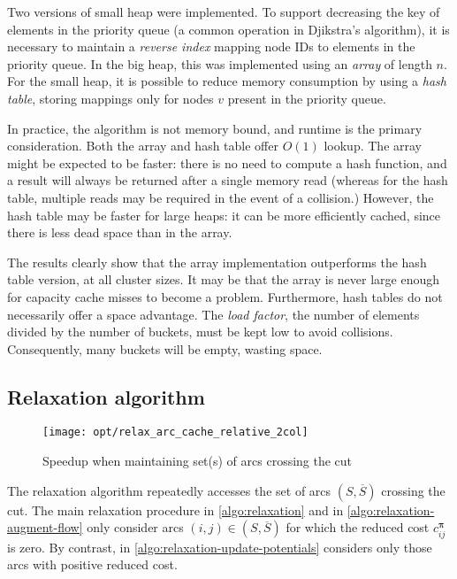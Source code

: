 Two versions of small heap were implemented. To support decreasing the key of elements in the priority queue (a common operation in Djikstra's algorithm), it is necessary to maintain a \emph{reverse index} mapping node IDs to elements in the priority queue. In the big heap, this was implemented using an \emph{array} of length $n$. For the small heap, it is possible to reduce memory consumption by using a \emph{hash table}, storing mappings only for nodes $v$ present in the priority queue.

In practice, the algorithm is not memory bound, and runtime is the primary consideration. Both the array and hash table offer $O(1)$ lookup. The array might be expected to be faster: there is no need to compute a hash function, and a result will always be returned after a single memory read (whereas for the hash table, multiple reads may be required in the event of a collision.) However, the hash table may be faster for large heaps: it can be more efficiently cached, since there is less dead space than in the array.

The results clearly show that the array implementation outperforms the hash table version, at all cluster sizes. It may be that the array is never large enough for capacity cache misses to become a problem. Furthermore, hash tables do not necessarily offer a space advantage. The \emph{load factor}, the number of elements divided by the number of buckets, must be kept low to avoid collisions. Consequently, many buckets will be empty, wasting space.


\subsection{Relaxation algorithm}

\begin{figure}
    \centering
    \texttt{[image: opt/relax\_arc\_cache\_relative\_2col]}
    \caption{Speedup when maintaining set(s) of arcs crossing the cut}
    \label{fig:opt-relax-cache-arcs}
\end{figure}

The relaxation algorithm repeatedly accesses the set of arcs $\left(S,\overline{S}\right)$ crossing the cut. The main relaxation procedure in \cref{algo:relaxation} and  in \cref{algo:relaxation-augment-flow} only consider arcs $(i,j) \in \left(S,\overline{S}\right)$ for which the reduced cost $c_{ij}^{\boldsymbol{\pi}}$ is zero. By contrast,  in \cref{algo:relaxation-update-potentials} considers only those arcs with positive reduced cost.

